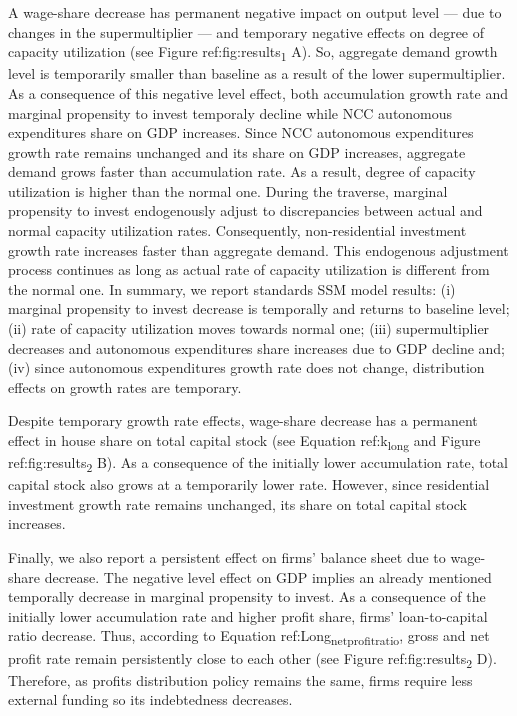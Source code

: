 \documentclass[12pt]{article}
\begin{document}
A wage-share decrease has permanent negative impact on output level --- due to changes in the supermultiplier --- and temporary negative effects on degree of capacity utilization (see Figure ref:fig:results\textsubscript{1} A).
So, aggregate demand growth level is temporarily smaller than baseline as a result of the lower supermultiplier.
As a consequence of this negative level effect, both accumulation growth rate and marginal propensity to invest temporaly decline while NCC autonomous expenditures share on GDP increases.
Since NCC autonomous expenditures growth rate remains unchanged and its share on GDP increases, aggregate demand grows faster than accumulation rate.
As a result, degree of capacity utilization is higher than the normal one.
During the traverse, marginal propensity to invest endogenously adjust to discrepancies between actual and normal capacity utilization rates.
Consequently, non-residential investment growth rate increases faster than aggregate demand.
This endogenous adjustment process continues as long as actual rate of capacity utilization is different from the normal one.
In summary, we report standards SSM model results:
    (i) marginal propensity to invest decrease is temporally and returns to baseline level;
    (ii) rate of capacity utilization moves towards normal one;
    (iii) supermultiplier decreases and autonomous expenditures share increases due to GDP decline and; 
    (iv) since autonomous expenditures growth rate does not change, distribution effects on growth rates are temporary. 


Despite temporary growth rate effects, wage-share decrease has a permanent effect in house share on total capital stock (see Equation ref:k\textsubscript{long} and Figure ref:fig:results\textsubscript{2} B).
As a consequence of the initially lower accumulation rate, total capital stock also grows at a temporarily lower rate.
However, since residential investment growth rate remains unchanged, its share on total capital stock increases.

Finally, we also report a persistent effect on firms' balance sheet due to wage-share decrease.
The negative level effect on GDP implies an already mentioned temporally decrease in marginal propensity to invest.
As a consequence of the initially lower accumulation rate and higher profit share, firms' loan-to-capital ratio decrease.
Thus, according to Equation ref:Long\textsubscript{netprofit}\textsubscript{ratio}, gross and net profit rate remain persistently close to each other (see Figure ref:fig:results\textsubscript{2} D).
Therefore, as profits distribution policy remains the same, firms require less external funding so its indebtedness decreases.
\end{document}
